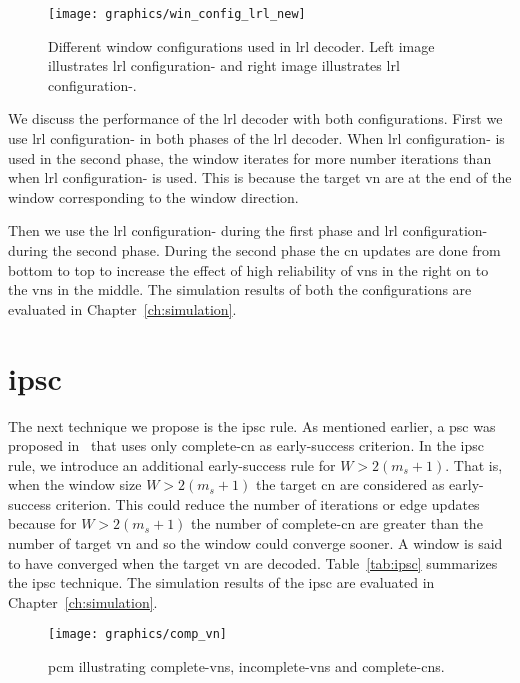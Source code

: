 \begin{figure}[htbp]
  \centering
  \texttt{[image: graphics/win\_config\_lrl\_new]}
  \caption{Different window configurations used in \gls{lrl} decoder. Left image illustrates \gls{lrl} configuration- and right image illustrates \gls{lrl} configuration-.}
  \label{fig:win_config_lrl}
\end{figure}

We discuss the performance of the \gls{lrl} decoder with both configurations. First we use \gls{lrl} configuration- in both phases of the \gls{lrl} decoder. When \gls{lrl} configuration- is used in the second phase, the window iterates for more number iterations than when \gls{lrl} configuration- is used. This is because the target \gls{vn} are at the end of the window corresponding to the window direction.

Then we use the \gls{lrl} configuration- during the first phase and \gls{lrl} configuration- during the second phase. During the second phase the \gls{cn} updates are done from bottom to top to increase the effect of high reliability of \glspl{vn} in the right on to the \glspl{vn} in the middle. The simulation results of both the configurations are evaluated in Chapter~\ref{ch:simulation}.

\section{\acrfull{ipsc}}
The next technique we propose is the \gls{ipsc} rule. As mentioned earlier, a \gls{psc} was proposed in~\cite{Kang2018} that uses only complete-\gls{cn} as early-success criterion. In the \gls{ipsc} rule, we introduce an additional early-success rule for $W>2(m_s+1)$. That is, when the window size $W>2(m_s+1)$ the target \gls{cn} are considered as early-success criterion. This could reduce the number of iterations or edge updates because for $W>2(m_s+1)$ the number of complete-\gls{cn} are greater than the number of target \gls{vn} and so the window could converge sooner. A window is said to have converged when the target \gls{vn} are decoded. Table~\ref{tab:ipsc} summarizes the \gls{ipsc} technique. The simulation results of the \gls{ipsc} are evaluated in Chapter~\ref{ch:simulation}.
\begin{figure}[htbp]
  \centering
  \texttt{[image: graphics/comp\_vn]}
  \caption{\gls{pcm} illustrating complete-\glspl{vn}, incomplete-\glspl{vn} and complete-\glspl{cn}.}
  \label{fig:comp_vn}
\end{figure}

